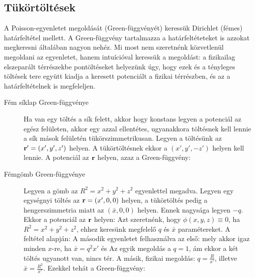   \subsection{Tükörtöltések}
   
   A Poisson-egyenletet megoldását (Green-függvényét) keressük Dirichlet (fémes) határfeltétel mellett. A Green-függvény tartalmazza a határfeltéteteket is azzokat megkeresni általában nagyon nehéz. Mi most nem szeretnénk közvetlenül megoldani az egyenletet, hanem intuícióval keressük a megoldást: a fizikailag elszeparált térrészekbe pontöltéseket helyezünk úgy, hogy ezek és a tényleges töltések tere együtt kiadja a keresett potenciált a fizikai térrészben, és az a határfeltételnek is megfeleljen. 
   
   \begin{description}
    \item[Fém síklap Green-függvénye]
     Ha van egy töltés a sík felett, akkor hogy konstans legyen a potenciál az egész felületen, akkor egy azzal ellentétes, ugyanakkora töltésnek kell lennie a sík mások felületén tükörszimmetrikusan. Legyen a töltésünk az $\mathbf{r'}=(x',y',z')$ helyen. A tükörtöltésnek ekkor a $(x',y',-z')$ helyen kell lennie. A potenciál az $\mathbf{r}$ helyen, azaz a Green-függvény:
    
    \item[Fémgömb Green-függvénye]
     Legyen a gömb az $R^2=x^2+y^2+z^2$ egyenlettel megadva. Legyen egy egységnyi töltés az $\mathbf{r}=(x',0,0)$ helyen, a tükörtöltés pedig a hengerszimmetria miatt az $(\bar{x},0,0)$ helyen. Ennek nagysága legyen $-q$. Ekkor a potenciál az $\mathbf{r}$ helyen:
     Azt szeretnénk, hogy $\phi(x,y,z)\equiv 0$, ha $R^2=x^2+y^2+z^2$, ehhez keresünk megfelelő $q$ és $\bar{x}$ paramétereket. A feltétel alapján:
     A második egyenletet felhasználva az első:
     mely akkor igaz minden $x$-re, ha $\bar{x}=q^2x'$ és 
     Az egyik megoldás a $q=1$, ám ekkor a két töltés ugyanott van, nincs tér. A másik, fizikai megoldás: $q=\frac{R}{x'}$, illetve $\bar{x}=\frac{R^2}{x'}$. Ezekkel tehát a Green-függvény:
     

\end{description}
